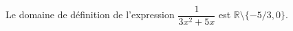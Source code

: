 Le domaine de définition de l'expression $\dfrac{1}{3x^2+5x}$ est $\mathbb R \setminus \{-5/3,0\}$.

\begin{reponses}
\end{reponses}

